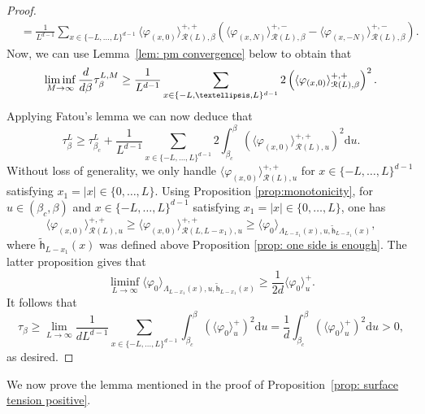 \documentclass[11pt,a4paper]{article}
\theoremstyle{definition}
\numberwithin{equation}{section}
\newcommand\cR{\mathcal{R}}
\begin{document}
\begin{proof}
\begin{align*}
&= \frac{1}{L^{d-1}} \sum_{x\in \{-L,\ldots,L\}^{d-1}}  \langle \varphi_{(x,0)} \rangle^{+,+}_{\cR(L),\beta}\left(\langle \varphi_{(x,N)} \rangle^{+,-}_{\cR(L),\beta} - \langle \varphi_{(x,-N)} \rangle^{+,-}_{\cR(L),\beta}\right).
\end{align*}
Now, we can use Lemma~\ref{lem: pm convergence} below to obtain that
\begin{equation}
\liminf_{M\to\infty}\frac{\rm d}{\rm d\beta} \tau^{L,M}_\beta \geq \frac{1}{L^{d-1}} \sum_{x\in \{-L,\ldots,L\}^{d-1}}  2\left(\langle \varphi_{(x,0)} \rangle^{+,+}_{\cR(L),\beta}\right)^2.
\end{equation}
Applying Fatou's lemma we can now deduce that
\begin{equation}
\tau_{\beta}^L\geq \tau_{\beta_c}^L+\frac{1}{L^{d-1}} \sum_{x\in \{-L,\ldots,L\}^{d-1}} 2\int_{\beta_c}^{\beta} \left(\langle \varphi_{(x,0)} \rangle^{+,+}_{\cR(L),u}\right)^2 \mathrm{d}u.
\end{equation}
Without loss of generality, we only handle $\langle \varphi_{(x,0)} \rangle^{+,+}_{\cR(L),u}$ for $x\in \{-L,\ldots,L\}^{d-1}$ satisfying $x_1=|x|\in \{0,\ldots,L\}$. Using Proposition \ref{prop:monotonicity}, for $u\in (\beta_c,\beta)$ and $x\in \{-L,\ldots,L\}^{d-1}$ satisfying $x_1=|x|\in \{0,\ldots,L\}$, one has
\begin{equation}
    \langle \varphi_{(x,0)}\rangle^{+,+}_{\mathcal{R}(L),u}\geq \langle \varphi_{(x,0)}\rangle^{+,+}_{\mathcal{R}(L,L-x_1),u}\geq \langle\varphi_0\rangle_{\Lambda_{L-x_1}(x),u,\tilde{\mathsf{h}}_{L-x_1}(x)},
\end{equation}
where $\tilde{\mathsf{h}}_{L-x_1}(x)$ was defined above Proposition \ref{prop: one side is enough}. The latter proposition gives that
\begin{equation}
    \liminf_{L\rightarrow \infty} \langle\varphi_0\rangle_{\Lambda_{L-x_1}(x),u,\tilde{\mathsf{h}}_{L-x_1}(x)}\geq \frac{1}{2d}\langle \varphi_0\rangle^+_u.
\end{equation}
It follows that
\begin{equation}
\tau_{\beta}\geq \lim_{L\to\infty} \frac{1}{d L^{d-1}} \sum_{x\in \{-L,\ldots,L\}^{d-1}} \int_{\beta_c}^{\beta} \left(\langle \varphi_{0} \rangle^+_{u}\right)^2 \mathrm{d}u= \frac{1}{d}\int_{\beta_c}^{\beta} \left(\langle \varphi_{0} \rangle^+_{u}\right)^2 \mathrm{d} u >0,
\end{equation}
as desired.
\end{proof}

We now prove the lemma mentioned in the proof of Proposition~\ref{prop: surface tension positive}.
\end{document}
